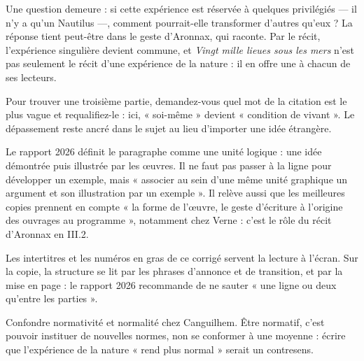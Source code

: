 \documentclass[11pt,a4paper]{article}
\begin{document}
Une question demeure : si cette expérience est réservée à quelques privilégiés --- il n'y a qu'un Nautilus ---, comment pourrait-elle transformer d'autres qu'eux ? La réponse tient peut-être dans le geste d'Aronnax, qui raconte. Par le récit, l'expérience singulière devient commune, et \emph{Vingt mille lieues sous les mers} n'est pas seulement le récit d'une expérience de la nature : il en offre une à chacun de ses lecteurs.

\begin{methode}

Pour trouver une troisième partie, demandez-vous quel mot de la citation est le plus vague et requalifiez-le : ici, « soi-même » devient « condition de vivant ». Le dépassement reste ancré dans le sujet au lieu d'importer une idée étrangère.

\end{methode}

\begin{jury}

Le rapport 2026 définit le paragraphe comme une unité logique : une idée démontrée puis illustrée par les œuvres. Il ne faut pas passer à la ligne pour développer un exemple, mais « associer au sein d'une même unité graphique un argument et son illustration par un exemple ». Il relève aussi que les meilleures copies prennent en compte « la forme de l'œuvre, le geste d'écriture à l'origine des ouvrages au programme », notamment chez Verne : c'est le rôle du récit d'Aronnax en III.2.

\end{jury}

\begin{methode}

Les intertitres et les numéros en gras de ce corrigé servent la lecture à l'écran. Sur la copie, la structure se lit par les phrases d'annonce et de transition, et par la mise en page : le rapport 2026 recommande de ne sauter « une ligne ou deux qu'entre les parties ».

\end{methode}

\begin{piege}

Confondre normativité et normalité chez Canguilhem. Être normatif, c'est pouvoir instituer de nouvelles normes, non se conformer à une moyenne : écrire que l'expérience de la nature « rend plus normal » serait un contresens.

\end{piege}
\end{document}
